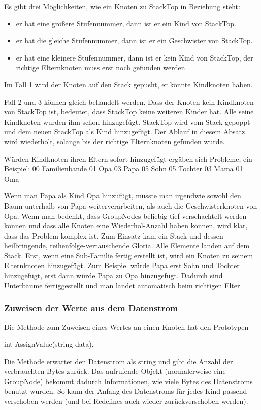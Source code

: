 Es gibt drei Möglichkeiten, wie ein Knoten zu StackTop in Beziehung steht:
\begin{itemize}
\item er hat eine größere Stufennummer, dann ist er ein Kind von StackTop.
\item er hat die gleiche Stufennummer, dann ist er ein Geschwister von StackTop.
\item er hat eine kleinere Stufennummer, dann ist er kein Kind von StackTop, der richtige Elternknoten muss erst noch gefunden werden.
\end{itemize}
Im Fall 1 wird der Knoten auf den Stack gepusht, er könnte Kindknoten haben.

Fall 2 und 3 können gleich behandelt werden. Dass der Knoten kein Kindknoten von StackTop ist, bedeutet, dass StackTop keine weiteren Kinder hat. Alle seine Kindknoten wurden ihm schon hinzugefügt. StackTop wird vom Stack gepoppt und dem neuen StackTop als Kind hinzugefügt. Der Ablauf in diesem Absatz wird wiederholt, solange bis der richtige Elternknoten gefunden wurde.


Würden Kindknoten ihren Eltern sofort hinzugefügt ergäben sich Probleme, ein Beispiel:
00 Familienbande
    01 Opa
        03 Papa
            05 Sohn
            05 Tochter
        03 Mama
    01 Oma

Wenn man Papa als Kind Opa hinzufügt, müsste man irgendwie sowohl den Baum unterhalb von Papa weiterverarbeiten, als auch die Geschwisterknoten von Opa. Wenn man bedenkt, dass GroupNodes beliebig tief verschachtelt werden können und dass alle Knoten eine Wiederhol-Anzahl haben können, wird klar, dass das Problem komplex ist. Zum Einsatz kam ein Stack und dessen heilbringende, reihenfolge-vertauschende Gloria. Alle Elemente landen auf dem Stack. Erst, wenn eine Sub-Familie fertig erstellt ist, wird ein Knoten zu seinem Elternknoten hinzugefügt. Zum Beispiel würde Papa erst Sohn und Tochter hinzugefügt, erst dann würde Papa zu Opa hinzugefügt. Dadurch sind Unterbäume fertiggestellt und man landet automatisch beim richtigen Elter.
        

\subsubsection{Zuweisen der Werte aus dem Datenstrom}
Die Methode zum Zuweisen eines Wertes an einen Knoten hat den Prototypen 

int AssignValue(string data).

Die Methode erwartet den Datenstrom als string und gibt die Anzahl der verbrauchten Bytes zurück. Das aufrufende Objekt (normalerweise eine GroupNode) bekommt dadurch Informationen, wie viele Bytes des Datenstroms benutzt wurden. So kann der Anfang des Datenstroms für jedes Kind passend verschoben werden (und bei Redefines auch wieder zurückverschoben werden).

